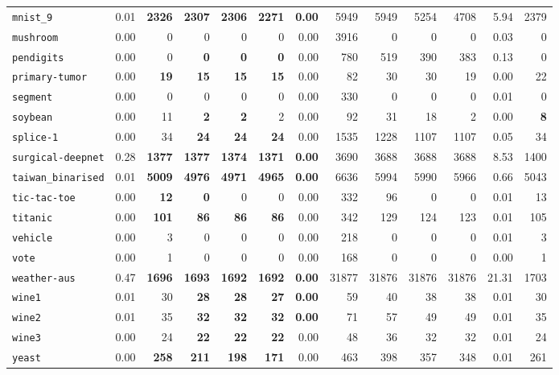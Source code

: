 \begin{tabular}{lrrrrrrrrrrrr}
\texttt{mnist\_9} & 0.01 & \textbf{2326} & \textbf{2307} & \textbf{2306} & \textbf{2271} & \textbf{0.00} & 5949 & 5949 & 5254 & 4708 & 5.94 & 2379\\
\texttt{mushroom} & 0.00 & 0 & 0 & 0 & 0 & 0.00 & 3916 & 0 & 0 & 0 & 0.03 & 0\\
\texttt{pendigits} & 0.00 & 0 & \textbf{0} & \textbf{0} & \textbf{0} & 0.00 & 780 & 519 & 390 & 383 & 0.13 & 0\\
\texttt{primary-tumor} & 0.00 & \textbf{19} & \textbf{15} & \textbf{15} & \textbf{15} & 0.00 & 82 & 30 & 30 & 19 & 0.00 & 22\\
\texttt{segment} & 0.00 & 0 & 0 & 0 & 0 & 0.00 & 330 & 0 & 0 & 0 & 0.01 & 0\\
\texttt{soybean} & 0.00 & 11 & \textbf{2} & \textbf{2} & 2 & 0.00 & 92 & 31 & 18 & 2 & 0.00 & \textbf{8}\\
\texttt{splice-1} & 0.00 & 34 & \textbf{24} & \textbf{24} & \textbf{24} & 0.00 & 1535 & 1228 & 1107 & 1107 & 0.05 & 34\\
\texttt{surgical-deepnet} & 0.28 & \textbf{1377} & \textbf{1377} & \textbf{1374} & \textbf{1371} & \textbf{0.00} & 3690 & 3688 & 3688 & 3688 & 8.53 & 1400\\
\texttt{taiwan\_binarised} & 0.01 & \textbf{5009} & \textbf{4976} & \textbf{4971} & \textbf{4965} & \textbf{0.00} & 6636 & 5994 & 5990 & 5966 & 0.66 & 5043\\
\texttt{tic-tac-toe} & 0.00 & \textbf{12} & \textbf{0} & 0 & 0 & 0.00 & 332 & 96 & 0 & 0 & 0.01 & 13\\
\texttt{titanic} & 0.00 & \textbf{101} & \textbf{86} & \textbf{86} & \textbf{86} & 0.00 & 342 & 129 & 124 & 123 & 0.01 & 105\\
\texttt{vehicle} & 0.00 & 3 & 0 & 0 & 0 & 0.00 & 218 & 0 & 0 & 0 & 0.01 & 3\\
\texttt{vote} & 0.00 & 1 & 0 & 0 & 0 & 0.00 & 168 & 0 & 0 & 0 & 0.00 & 1\\
\texttt{weather-aus} & 0.47 & \textbf{1696} & \textbf{1693} & \textbf{1692} & \textbf{1692} & \textbf{0.00} & 31877 & 31876 & 31876 & 31876 & 21.31 & 1703\\
\texttt{wine1} & 0.01 & 30 & \textbf{28} & \textbf{28} & \textbf{27} & \textbf{0.00} & 59 & 40 & 38 & 38 & 0.01 & 30\\
\texttt{wine2} & 0.01 & 35 & \textbf{32} & \textbf{32} & \textbf{32} & \textbf{0.00} & 71 & 57 & 49 & 49 & 0.01 & 35\\
\texttt{wine3} & 0.00 & 24 & \textbf{22} & \textbf{22} & \textbf{22} & 0.00 & 48 & 36 & 32 & 32 & 0.01 & 24\\
\texttt{yeast} & 0.00 & \textbf{258} & \textbf{211} & \textbf{198} & \textbf{171} & 0.00 & 463 & 398 & 357 & 348 & 0.01 & 261\\
\bottomrule
\end{tabular}
